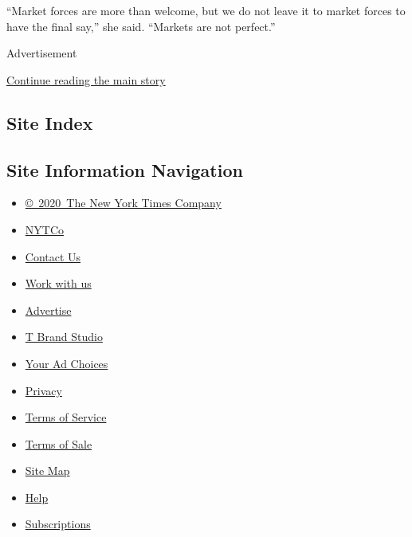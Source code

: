 ``Market forces are more than welcome, but we do not leave it to market
forces to have the final say,'' she said. ``Markets are not perfect.''

Advertisement

\protect\hyperlink{after-bottom}{Continue reading the main story}

\hypertarget{site-index}{%
\subsection{Site Index}\label{site-index}}

\hypertarget{site-information-navigation}{%
\subsection{Site Information
Navigation}\label{site-information-navigation}}

\begin{itemize}
\tightlist
\item
  \href{https://help.nytimes3xbfgragh.onion/hc/en-us/articles/115014792127-Copyright-notice}{©~2020~The
  New York Times Company}
\end{itemize}

\begin{itemize}
\tightlist
\item
  \href{https://www.nytco.com/}{NYTCo}
\item
  \href{https://help.nytimes3xbfgragh.onion/hc/en-us/articles/115015385887-Contact-Us}{Contact
  Us}
\item
  \href{https://www.nytco.com/careers/}{Work with us}
\item
  \href{https://nytmediakit.com/}{Advertise}
\item
  \href{http://www.tbrandstudio.com/}{T Brand Studio}
\item
  \href{https://www.nytimes3xbfgragh.onion/privacy/cookie-policy\#how-do-i-manage-trackers}{Your
  Ad Choices}
\item
  \href{https://www.nytimes3xbfgragh.onion/privacy}{Privacy}
\item
  \href{https://help.nytimes3xbfgragh.onion/hc/en-us/articles/115014893428-Terms-of-service}{Terms
  of Service}
\item
  \href{https://help.nytimes3xbfgragh.onion/hc/en-us/articles/115014893968-Terms-of-sale}{Terms
  of Sale}
\item
  \href{https://spiderbites.nytimes3xbfgragh.onion}{Site Map}
\item
  \href{https://help.nytimes3xbfgragh.onion/hc/en-us}{Help}
\item
  \href{https://www.nytimes3xbfgragh.onion/subscription?campaignId=37WXW}{Subscriptions}
\end{itemize}
